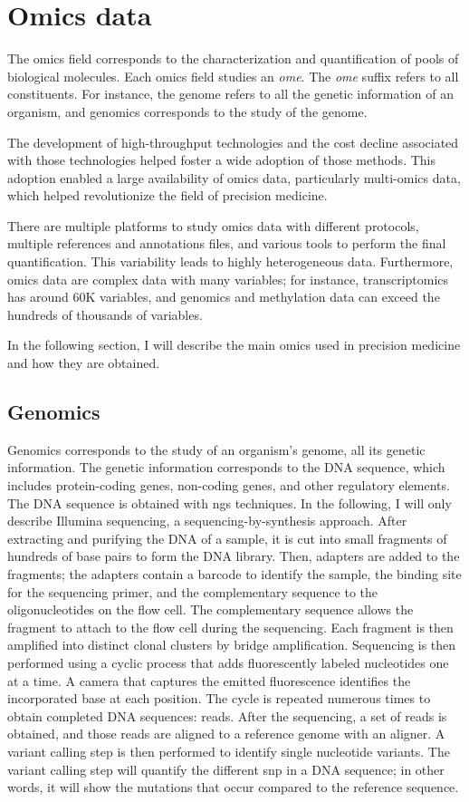 \documentclass[../main.tex]{subfiles}
\begin{document}
\section{Omics data}
	The omics field corresponds to the characterization and quantification of pools of biological molecules.
	Each omics field studies an \emph{ome}.
	The \emph{ome} suffix refers to all constituents.
	For instance, the genome refers to all the genetic information of an organism, and genomics corresponds to the study of the genome.

	The development of high-throughput technologies and the cost decline associated with those technologies helped foster a wide adoption of those methods.
	This adoption enabled a large availability of omics data, particularly multi-omics data, which helped revolutionize the field of precision medicine.

	There are multiple platforms to study omics data with different protocols, multiple references and annotations files, and various tools to perform the final quantification.
	This variability leads to highly heterogeneous data.
	Furthermore, omics data are complex data with many variables; for instance, transcriptomics has around 60K variables, and genomics and methylation data can exceed the hundreds of thousands of variables.

	In the following section, I will describe the main omics used in precision medicine and how they are obtained.

	\subsection{Genomics}\label{subsec:genomics}
		Genomics corresponds to the study of an organism's genome, \ie{}all its genetic information.
		The genetic information corresponds to the DNA sequence, which includes protein-coding genes, non-coding genes, and other regulatory elements.
		The DNA sequence is obtained with \gls{ngs} techniques.
		In the following, I will only describe Illumina sequencing, a sequencing-by-synthesis approach.
		After extracting and purifying the DNA of a sample, it is cut into small fragments of hundreds of base pairs to form the DNA library.
		Then, adapters are added to the fragments; the adapters contain a barcode to identify the sample, the binding site for the sequencing primer, and the complementary sequence to the oligonucleotides on the flow cell.
		The complementary sequence allows the fragment to attach to the flow cell during the sequencing.
		Each fragment is then amplified into distinct clonal clusters by bridge amplification.
		Sequencing is then performed using a cyclic process that adds fluorescently labeled nucleotides one at a time.
		A camera that captures the emitted fluorescence identifies the incorporated base at each position.
		The cycle is repeated numerous times to obtain completed DNA sequences: reads.
		After the sequencing, a set of reads is obtained, and those reads are aligned to a reference genome with an aligner.
		A variant calling step is then performed to identify single nucleotide variants.
		The variant calling step will quantify the different \gls{snp} in a DNA sequence; in other words, it will show the mutations that occur compared to the reference sequence.
\end{document}
